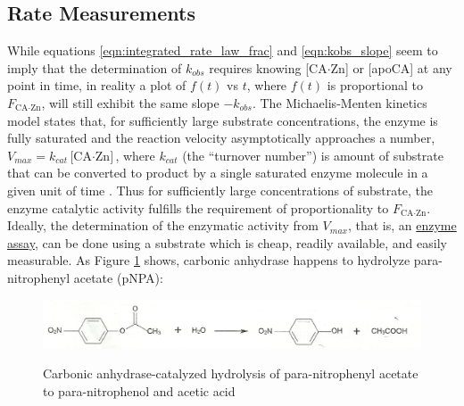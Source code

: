\subsection{Rate Measurements}
While equations \eqref{eqn:integrated_rate_law_frac} and \eqref{eqn:kobs_slope} seem to imply that the determination of $k_{obs}$ requires knowing [CA$\cdot$Zn] or [apoCA] at any point in time, in reality a plot of $f(t)$ vs $t$, where $f(t)$ is proportional to $F_\text{CA$\cdot$Zn}$, will still exhibit the same slope $-k_{obs}$. The Michaelis-Menten kinetics model states that, for sufficiently large substrate concentrations, the enzyme is fully saturated and the reaction velocity asymptotically approaches a number, $V_{max}=k_{cat}\text{[CA$\cdot$Zn]}$, where $k_{cat}$ (the ``turnover number'') is amount of substrate that can be converted to product by a single saturated enzyme molecule in a given unit of time \cite{bib:lehninger_mm}. Thus for sufficiently large concentrations of substrate, the enzyme catalytic activity fulfills the requirement of proportionality to $F_\text{CA$\cdot$Zn}$. Ideally, the determination of the enzymatic activity from $V_{max}$, that is, an \underline{enzyme assay}, can be done using a substrate which is cheap, readily available, and easily measurable. As Figure \ref{fig:pnpa_reaction} shows, carbonic anhydrase happens to hydrolyze para-nitrophenyl acetate (pNPA):
\begin{figure}[h]
  \includegraphics[width=.9\textwidth]{./Figures/pnpa_hydrolysis.jpg}\\
  \caption{Carbonic anhydrase-catalyzed hydrolysis of para-nitrophenyl acetate to para-nitrophenol and acetic acid}\label{fig:pnpa_reaction}
\end{figure}